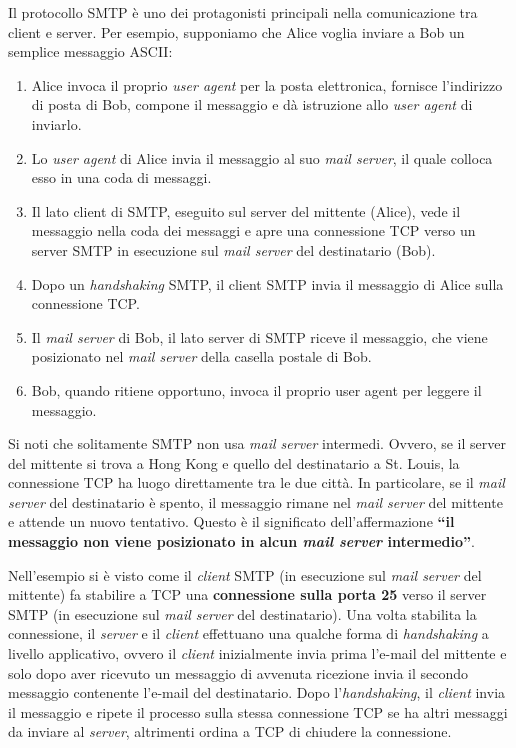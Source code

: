 \documentclass[a4paper]{article}
\newcommand{\dquotes}[1]{``#1''}
\begin{document}
	\noindent
	Il protocollo SMTP è uno dei protagonisti principali nella comunicazione tra client e server. Per esempio, supponiamo che Alice voglia inviare a Bob un semplice messaggio ASCII:
	\begin{enumerate}
		\item Alice invoca il proprio \emph{user agent} per la posta elettronica, fornisce l’indirizzo di posta di Bob, compone il messaggio e dà istruzione allo \emph{user agent} di inviarlo.
		
		\item Lo \emph{user agent} di Alice invia il messaggio al suo \emph{mail server}, il quale colloca esso in una coda di messaggi.
		
		\item Il lato client di SMTP, eseguito sul server del mittente (Alice), vede il messaggio nella coda dei messaggi e apre una connessione TCP verso un server SMTP in esecuzione sul \emph{mail server} del destinatario (Bob).
		
		\item Dopo un \emph{handshaking} SMTP, il client SMTP invia il messaggio di Alice sulla connessione TCP.
		
		\item Il \emph{mail server} di Bob, il lato server di SMTP riceve il messaggio, che viene posizionato nel \emph{mail server} della casella postale di Bob.
		
		\item Bob, quando ritiene opportuno, invoca il proprio user agent per leggere il messaggio.
	\end{enumerate}
	Si noti che solitamente SMTP non usa \emph{mail server} intermedi. Ovvero, se il server del mittente si trova a Hong Kong e quello del destinatario a St. Louis, la connessione TCP ha luogo direttamente tra le due città. In particolare, se il \emph{mail server} del destinatario è spento, il messaggio rimane nel \emph{mail server} del mittente e attende un nuovo tentativo. Questo è il significato dell’affermazione \textbf{\dquotes{il messaggio non viene posizionato in alcun \emph{mail server} intermedio}}.\newline
	
	\noindent
	Nell’esempio si è visto come il \emph{client} SMTP (in esecuzione sul \emph{mail server} del mittente) fa stabilire a TCP una \textbf{connessione sulla porta 25} verso il server SMTP (in esecuzione sul \emph{mail server} del destinatario).\newline
	Una volta stabilita la connessione, il \emph{server} e il \emph{client} effettuano una qualche forma di \emph{handshaking} a livello applicativo, ovvero il \emph{client} inizialmente invia prima l’e-mail del mittente e solo dopo aver ricevuto un messaggio di avvenuta ricezione invia il secondo messaggio contenente l’e-mail del destinatario.\newline
	Dopo l’\emph{handshaking}, il \emph{client} invia il messaggio e ripete il processo sulla stessa connessione TCP se ha altri messaggi da inviare al \emph{server}, altrimenti ordina a TCP di chiudere la connessione.
	
\end{document}
